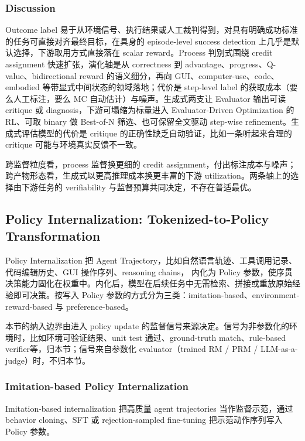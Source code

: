 

\subsubsection{Discussion}

Outcome label 易于从环境信号、执行结果或人工裁判得到，对具有明确成功标准的任务可直接对齐最终目标，在具身的 episode-level success detection 上几乎是默认选择，下游取用方式直接落在 scalar reward。Process 判别式围绕 credit assignment 快速扩张，演化轴是从 correctness 到 advantage、progress、Q-value、bidirectional reward 的语义细分，再向 GUI、computer-use、code、embodied 等带显式中间状态的领域落地；代价是 step-level label 的获取成本（要么人工标注，要么 MC 自动估计）与噪声。生成式两支让 Evaluator 输出可读 critique 或 diagnosis，下游可塌缩为标量进入 Evaluator-Driven Optimization 的 RL、可取 binary 做 Best-of-N 筛选、也可保留全文驱动 step-wise refinement。生成式评估模型的代价是 critique 的正确性缺乏自动验证，比如一条听起来合理的 critique 可能与环境真实反馈不一致。

跨监督粒度看，process 监督换更细的 credit assignment，付出标注成本与噪声；跨产物形态看，生成式以更高推理成本换更丰富的下游 utilization。两条轴上的选择由下游任务的 verifiability 与监督预算共同决定，不存在普适最优。

\subsection{Policy Internalization: Tokenized-to-Policy Transformation}

Policy Internalization 把 Agent Trajectory，比如自然语言轨迹、工具调用记录、代码编辑历史、GUI 操作序列、reasoning chains， 内化为 Policy 参数，使序贯决策能力固化在权重中。内化后，模型在后续任务中无需检索、拼接或重放原始经验即可决策。按写入 Policy 参数的方式分为三类：imitation-based、environment-reward-based 与 preference-based。

本节的纳入边界由进入 policy update 的监督信号来源决定。信号为非参数化的环境时，比如环境可验证结果、unit test 通过、ground-truth match、rule-based verifier等，归本节；信号来自参数化 evaluator（trained RM / PRM / LLM-as-a-judge）时，不归本节。

\subsubsection{Imitation-based Policy Internalization}

Imitation-based internalization 把高质量 agent trajectories 当作监督示范，通过 behavior cloning、SFT 或 rejection-sampled fine-tuning 把示范动作序列写入 Policy 参数。


